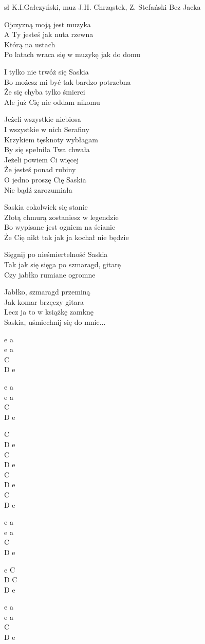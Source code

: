 {sł K.I.Gałczyński, muz J.H. Chrząstek, Z. Stefański}
{Bez Jacka}
\begin{text}
Ojczyzną moją jest muzyka\\
A Ty jesteś jak nuta rzewna\\
Którą na ustach\\
Po latach wraca się w muzykę jak do domu

I tylko nie trwóż się Saskia\\
Bo możesz mi być tak bardzo potrzebna\\
Że się chyba tylko śmierci\\
Ale już Cię nie oddam nikomu

Jeżeli wszystkie niebiosa\\
I wszystkie w nich Serafiny\\
Krzykiem tęsknoty wybłagam\\
By się spełniła Twa chwała\\
Jeżeli powiem Ci więcej\\
Że jesteś ponad rubiny\\
O jedno proszę Cię Saskia\\
Nie bądź zarozumiała

Saskia cokolwiek się stanie\\
Złotą chmurą zostaniesz w legendzie\\
Bo wypisane jest ogniem na ścianie\\
Że Cię nikt tak jak ja kochał nie będzie

Sięgnij po nieśmiertelność Saskia\\
Tak jak się sięga po szmaragd, gitarę\\
Czy jabłko rumiane ogromne

Jabłko, szmaragd przeminą\\
Jak komar brzęczy gitara\\
Lecz ja to w książkę zamknę\\
Saskia, uśmiechnij się do mnie...
\end{text}
\begin{chord}
    e a\\
    e a\\
    C\\
    D e

    e a\\
    e a\\
    C\\
    D e

    C\\
    D e\\
    C\\
    D e\\
    C\\
    D e\\
    C\\
    D e

    e a\\
    e a\\
    C\\
    D e

    e C\\
    D C\\
    D e

    e a\\
    e a\\
    C\\
    D e
\end{chord}